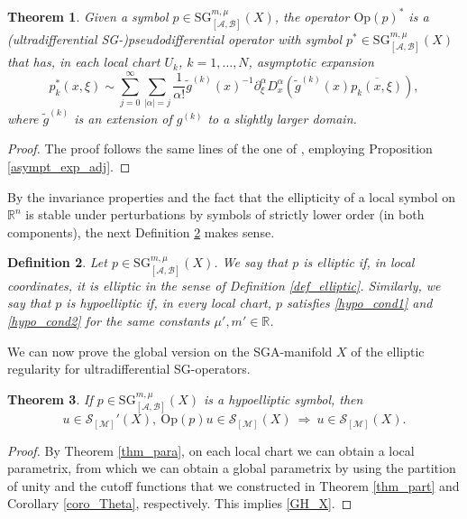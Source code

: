 \documentclass[11pt,reqno]{amsart}
\numberwithin{equation}{section}
\newtheorem{theorem}{Theorem}[section]
\newtheorem{definition}[theorem]{Definition}
\newcommand{\R}{{\mathbb{R}}} %
\newcommand{\Op}{{\mathrm{Op}}}
\newcommand{\SG}{{\mathrm{SG}}}
\newcommand{\M}{{\mathcal{M}}} %
\newcommand{\A}{{\mathcal{A}}} %
\newcommand{\B}{{\mathcal{B}}} %
\begin{document}
\begin{theorem}
	Given a symbol $p\in {\SG}_{[\A,\B]}^{m,\mu}(X)$, the operator $\mathrm{Op}(p)^*$ is a (ultradifferential SG-)pseudodifferential operator with symbol 
	$p^*\in {\SG}_{[\A,\B]}^{m,\mu}(X)$ that has, in each local chart $U_k$, $k=1,\dots,N$, asymptotic expansion
	\begin{equation*}
		p_k^*(x,\xi)\sim \sum_{j=0}^\infty\sum_{|\alpha|=j}\frac{1}{\alpha!}\tilde{g}^{(k)}(x)^{-1}\partial_\xi^\alpha D_x^\alpha(\tilde{g}^{(k)}(x) \overline{p_k(x,\xi)}),
	\end{equation*}
	where $\tilde{g}^{(k)}$ is an extension of ${g}^{(k)}$ to a slightly larger domain.
\end{theorem}
%
\begin{proof}
	The proof follows the same lines of the one of \cite[Theorem 7.9]{Kumano-go}, employing Proposition \ref{asympt_exp_adj}.
\end{proof}

By the invariance properties and the fact that the ellipticity of a local symbol on $\R^n$ is stable under perturbations by symbols of strictly lower order
(in both components), the next Definition \ref{def:ellX} makes sense.

\begin{definition}\label{def:ellX}
	Let $p\in {\SG}_{[\A,\B]}^{m,\mu}(X)$. We say that $p$ is elliptic if, in local coordinates, it is elliptic in the sense of Definition \ref{def_elliptic}. 
	Similarly, we say that $p$ is hypoelliptic if, in every local chart, $p$ satisfies \eqref{hypo_cond1} and \eqref{hypo_cond2} for the same constants $\mu',m'\in\R$.
\end{definition}

We can now prove the global version on the SGA-manifold $X$ of the elliptic regularity for ultradifferential SG-operators.

\begin{theorem}
	If $p\in {\SG}_{[\A,\B]}^{m,\mu}(X)$ is a hypoelliptic symbol, then
	\begin{equation}\label{GH_X}
		u\in\mathcal{S}_{[\M]}'(X),\ \Op(p)u\in \mathcal{S}_{[\M]}(X)\ \Rightarrow\ u\in \mathcal{S}_{[\M]}(X).
	\end{equation}
\end{theorem}
%
\begin{proof}
	By Theorem \ref{thm_para}, on each local chart we can obtain a local parametrix, from which we can obtain a global parametrix by using the partition of unity 
	and the cutoff functions that we constructed in Theorem \ref{thm_part} and Corollary \ref{coro_Theta}, respectively. This implies \eqref{GH_X}.
\end{proof}
\end{document}
